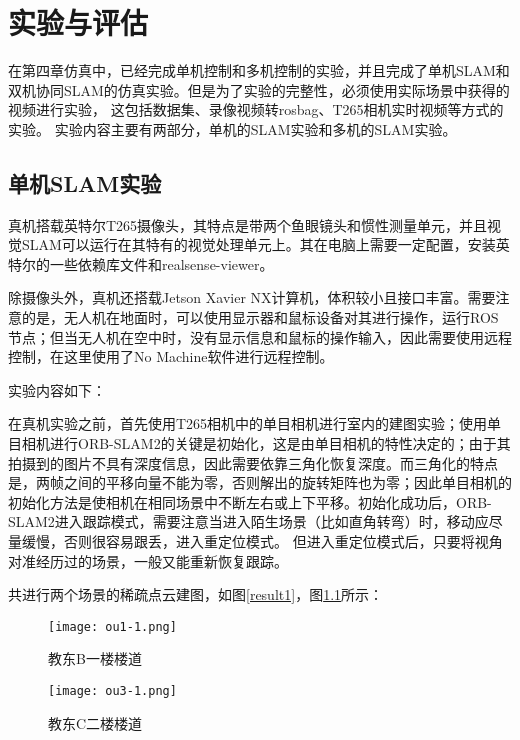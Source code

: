 \renewcommand{\baselinestretch}{1.5}
\fontsize{12pt}{13pt}\selectfont

\chapter{实验与评估} \label{experiment}

在第四章仿真中，已经完成单机控制和多机控制的实验，并且完成了单机SLAM和双机协同SLAM的仿真实验。但是为了实验的完整性，必须使用实际场景中获得的视频进行实验，
这包括数据集、录像视频转rosbag、T265相机实时视频等方式的实验。
实验内容主要有两部分，单机的SLAM实验和多机的SLAM实验。

\section{单机SLAM实验}

真机搭载英特尔T265摄像头，其特点是带两个鱼眼镜头和惯性测量单元，并且视觉SLAM可以运行在其特有的视觉处理单元上。其在电脑上需要一定配置，安装英特尔的一些依赖库文件和realsense-viewer。

除摄像头外，真机还搭载Jetson Xavier NX计算机，体积较小且接口丰富。需要注意的是，无人机在地面时，可以使用显示器和鼠标设备对其进行操作，运行ROS节点；但当无人机在空中时，没有显示信息和鼠标的操作输入，因此需要使用远程控制，在这里使用了No Machine软件进行远程控制。

实验内容如下：

在真机实验之前，首先使用T265相机中的单目相机进行室内的建图实验；使用单目相机进行ORB-SLAM2的关键是初始化，这是由单目相机的特性决定的；由于其拍摄到的图片不具有深度信息，因此需要依靠三角化恢复深度。而三角化的特点是，两帧之间的平移向量不能为零，否则解出的旋转矩阵也为零；因此单目相机的初始化方法是使相机在相同场景中不断左右或上下平移。初始化成功后，ORB-SLAM2进入跟踪模式，需要注意当进入陌生场景（比如直角转弯）时，移动应尽量缓慢，否则很容易跟丢，进入重定位模式。
但进入重定位模式后，只要将视角对准经历过的场景，一般又能重新恢复跟踪。

共进行两个场景的稀疏点云建图，如图\ref{result1}，图\ref{result2}所示：

\begin{figure}[htbp]
	\centering
	\begin{minipage}[t]{0.45\columnwidth} %
		\centering
		\texttt{[image: ou1-1.png]}
		\caption{教东B一楼楼道}
		\label{result1}
	\end{minipage}
	\begin{minipage}[t]{0.45\columnwidth}
		\centering
		\texttt{[image: ou3-1.png]}
		\caption{教东C二楼楼道}
		\label{result2}
	\end{minipage}
\end{figure}


